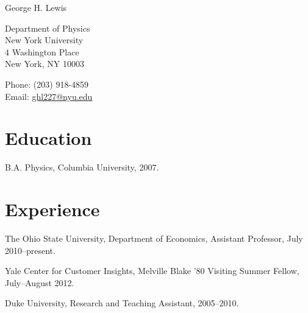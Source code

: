 \documentclass[10pt,letterpaper]{article}
\def\name{George H. Lewis}
\renewenvironment{itemize}{
  \begin{list}{}{
    \setlength{\leftmargin}{1.5em}
    \setlength{\itemsep}{0.25em}
    \setlength{\parskip}{0pt}
    \setlength{\parsep}{0.25em}
  }
}{
  \end{list}
}
\begin{document}
{\huge \name}


\bigskip

\begin{minipage}[t]{0.495\textwidth}
  Department of Physics \\
  New York University \\
  4 Washington Place \\
  New York, NY 10003
\end{minipage}
\begin{minipage}[t]{0.495\textwidth}
  Phone: (203) 918-4859 \\
  Email: \href{mailto:ghl227@nyu.edu}{ghl227@nyu.edu} \\
\end{minipage}

\section*{Education}

\begin{itemize}
  \item B.A. Physics,
    Columbia University, 2007.
\end{itemize}

\section*{Experience}

\begin{itemize}
\item The Ohio State University, Department of Economics,
  Assistant Professor, July 2010--present.
\item Yale Center for Customer Insights,
  Melville Blake '80 Visiting Summer Fellow,
  July--August 2012.
\item Duke University,
  Research and Teaching Assistant,
  2005--2010.
\end{itemize}
\end{document}
